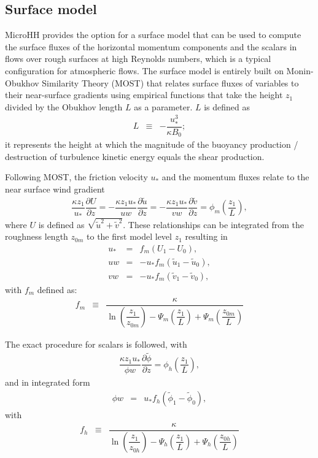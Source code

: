 \documentclass[gmd]{copernicus}
\newcommand{\uf}{\ensuremath{\widetilde{u}}}
\newcommand{\vf}{\ensuremath{\widetilde{v}}}
\newcommand{\phif}{\ensuremath{\widetilde{\phi}}}
\begin{document}
\subsection{Surface model}\label{sec:surface_model}
MicroHH provides the option for a surface model that can be used to compute the surface fluxes of the horizontal momentum components and the scalars in flows over rough surfaces at high Reynolds numbers, which is a typical configuration for atmospheric flows. The surface model is entirely built on Monin-Obukhov Similarity Theory (MOST) that relates surface fluxes of variables to their near-surface gradients using empirical functions that take the height $z_1$ divided by the Obukhov length $L$ as a parameter. $L$ is defined as
\begin{eqnarray}
L   & \equiv & - \dfrac{u_*^3}{\kappa B_0};
\end{eqnarray}
it represents the height at which the magnitude of the buoyancy production / destruction of turbulence kinetic energy equals the shear production.

Following MOST, the friction velocity $u_*$ and the momentum fluxes relate to the near surface wind gradient
\begin{eqnarray}
\dfrac{\kappa z_1}{u_*} \dfrac{\partial U}{\partial z}  = 
- \dfrac{\kappa z_1 u_*}{u w} \dfrac{\partial \uf}{\partial z} =
- \dfrac{\kappa z_1 u_*}{v w} \dfrac{\partial \vf}{\partial z} =
\phi_m \left( \dfrac{z_1}{L} \right),\label{eq:surf_grad}
\end{eqnarray}
where $U$ is defined as $\sqrt{\uf^2 + \vf^2}$. These relationships can be integrated from the roughness length $z_{0m}$ to the first model level $z_1$ resulting in 
\begin{eqnarray}
u_* & =  & f_m \left( U_1 - U_0 \right),\\
uw & = & - u_* f_m \left( \uf_1 - \uf_0 \right),\\
vw & = & - u_* f_m \left( \vf_1 - \vf_0 \right),
\end{eqnarray}
with $f_m$ defined as:
\begin{eqnarray}
f_m & \equiv & \dfrac{\kappa}
{ \ln{\left( \dfrac{z_1}{z_{0m}} \right)}
	- \varPsi_m \left( \dfrac{z_1}{L} \right)
	+ \varPsi_m \left( \dfrac{z_{0m}}{L} \right) }
\end{eqnarray}

The exact procedure for scalars is followed, with
\begin{eqnarray}
\dfrac{\kappa z_1 u_*}{\phi w} \dfrac{\partial \phif}{\partial z} =
\phi_h \left( \dfrac{z_1}{L} \right),
\end{eqnarray}
and in integrated form
\begin{eqnarray}
\phi w & = & u_* f_h \left( \phif_1 - \phif_0 \right),
\end{eqnarray}
with
\begin{eqnarray}
f_h & \equiv &
\dfrac{\kappa}
{ \ln{\left( \dfrac{z_1}{z_{0h}} \right)}
	- \varPsi_h \left( \dfrac{z_1}{L} \right)
	+ \varPsi_h \left( \dfrac{z_{0h}}{L} \right) }
\end{eqnarray}
\end{document}
